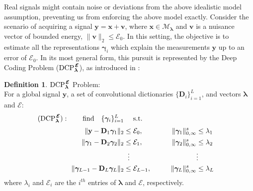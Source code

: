 \documentclass[10pt,journal]{IEEEtran}
\def\x{{\mathbf x}}
\def\v{{\mathbf v}}
\def\y{{\mathbf y}}
\def\D{{\mathbf D}}
\def\gama{{\boldsymbol \gamma}}
\def\lamda{{\boldsymbol \lambda}}
\def\vps{{\bm{\mathbf{\mathcal{E}}}}}
\def\DCPE{{\text{DCP}_\lamda^{\hspace{0.04cm} \vps}}}
\theoremstyle{plain}
\theoremstyle{definition}
\newtheorem{defn}[thm]{Definition} %
\begin{document}
Real signals might contain noise or deviations from the above idealistic model assumption, preventing us from enforcing the above model exactly. Consider the scenario of acquiring a signal $\y = \x + \v$, where $\x \in \mathcal{M}_\lamda$ and $\v$ is a nuisance vector of bounded energy, $\|\v\|_2 \leq \mathcal{E}_0$. In this setting, the objective is to estimate all the representations $\gama_i$ which explain the measurements $\y$ up to an error of $\mathcal{E}_0$. %
In its most general form, this pursuit is represented by the Deep Coding Problem ($\DCPE$), as introduced in \cite{Papyan2016convolutional}:

\begin{defn}{$\DCPE$ Problem:}\\
	For a global signal $\y$, a set of convolutional dictionaries $\{ \D_i \}_{i=1}^L$, and vectors $\lamda$ and $\vps$:
	\begin{align*}
	 (\DCPE): \quad \quad \text{find} \quad \{\gama_i\}_{i=1}^{L} & \quad \text{ s.t. } & \\[.1cm]
	\| \y - \D_1 \gama_1\|_2 & \leq \mathcal{E}_0, & \qquad \| \gama_1 \|^s_{0,\infty}  & \leq \lambda_1 &\\
	\| \gama_1 - \D_2 \gama_2 \|_2 & \leq \mathcal{E}_1,& \qquad  \| \gama_2 \|^s_{0,\infty}  & \leq \lambda_2 &\\
	 &\phantom{..} \vdots & \phantom{..} &\vdots  \\
	\| \gama_{L-1} - \D_L \gama_L \|_2  &\leq \mathcal{E}_{L-1},& \qquad \| \gama_{L} \|^s_{0,\infty} &\leq \lambda_L &
	\end{align*}
	where $\lambda_i$ and $\mathcal{E}_i$ are the $i^{th}$ entries of $\lamda$ and $\vps$, respectively.
\end{defn}
\end{document}
